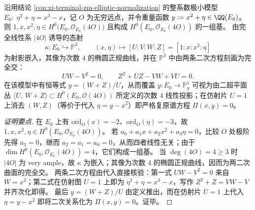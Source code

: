 

\begin{conclusion}\label{con:xi-terminal-zm-elliptic-degree4-projective-model}
沿用结论 \ref{con:xi-terminal-zm-elliptic-normalization} 的整系数极小模型
\(
E_0:\ \eta^{2}+\eta=x^{3}-x
\)，记 \(O\) 为无穷远点，并令重量函数
\(
y:=x^{2}+\eta\in\QQ(E_0)
\)。
则
\(
1,x,x^{2},\eta\in H^{0}\!\bigl(E_0,\mathcal O_{E_0}(4O)\bigr)
\)
且构成 \(H^{0}(E_0,\mathcal O_{E_0}(4O))\) 的一组基。
由完全线性系 \(|4O|\) 诱导的态射
\[
\kappa:E_0\hookrightarrow \mathbb P^{3},\qquad
(x,\eta)\longmapsto [U:V:W:Z]=[1:x:x^{2}:\eta]
\]
为射影嵌入，其像为次数 \(4\) 的椭圆正规曲线，并在 \(\mathbb P^{3}\) 中由两条二次方程刻画为完全交：
\[
UW-V^{2}=0,
\qquad
Z^{2}+UZ-VW+VU=0.
\]
在该模型中有恒等式 \(y=(W+Z)/U\)，从而覆盖 \(y:E_0\to\mathbb P^{1}_{y}\) 可视为由二超平面丛 \(\langle U,\ W+Z\rangle\subset H^{0}(E_0,\mathcal O(4O))\) 所定义的次数 \(4\) 线性投影；在仿射片 \(U=1\) 上消去 \((W,Z)\)（等价于代入 \(\eta=y-x^{2}\)）即严格复原谱方程 \(\Pi(x,y)=0\)。
\end{conclusion}
\begin{proof}[证明要点]
在 \(E_0\) 上有 \(\mathrm{ord}_{O}(x)=-2\)、\(\mathrm{ord}_{O}(\eta)=-3\)，故 \(1,x,x^{2},\eta\in H^{0}(E_0,\mathcal O_{E_0}(4O))\)。
若 \(a_{0}+a_{1}x+a_{2}x^{2}+a_{3}\eta=0\)，比较 \(O\) 处极阶先得 \(a_{3}=0\)，继而 \(a_{2}=a_{1}=a_{0}=0\)，从而四者线性无关；由于 \(\dim H^{0}(E_0,\mathcal O_{E_0}(4O))=4\)，它们构成一组基。
当 \(\deg(4O)=4\ge 3\) 时 \(|4O|\) 为 very ample，故 \(\kappa\) 为嵌入；其像为次数 \(4\) 的椭圆正规曲线，因而为两二次曲面的完全交。
两条二次方程由代入直接核验：第一式 \(UW-V^{2}=0\) 来自 \(W=x^{2}\)；第二式在仿射图 \(U=1\) 上即为 \(\eta^{2}+\eta=x^{3}-x\)，写作 \(Z^{2}+Z=VW-V\) 并齐次化即得。
最后 \(y=(W+Z)/U\) 由定义推出，而在仿射片 \(U=1\) 上代入 \(\eta=y-x^{2}\) 即将二次关系化为 \(\Pi(x,y)=0\)。证毕。
\end{proof}

